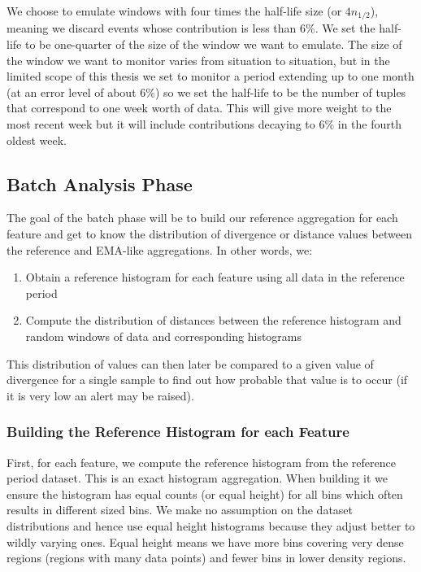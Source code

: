 We choose to emulate windows with four times the half-life size (or $4n_{1/2}$), meaning we discard events whose contribution is less than 6\%. We set the half-life to be one-quarter of the size of the window we want to emulate. The size of the window we want to monitor varies from situation to situation, but in the limited scope of this thesis we set to monitor a period extending up to one month (at an error level of about 6\%) so we set the half-life to be the number of tuples that correspond to one week worth of data. This will give more weight to the most recent week but it will include contributions decaying to 6\% in the fourth oldest week.

\subsection{Batch Analysis Phase} \label{sec:batch-phase}
The goal of the batch phase will be to build our reference aggregation for each feature and get to know the distribution of divergence or distance values between the reference and EMA-like aggregations. In other words, we:

\begin{enumerate}
    \item Obtain a reference histogram for each feature using all data in the reference period
    
    \item Compute the distribution of distances between the reference histogram and random windows of data and corresponding histograms
\end{enumerate}

This distribution of values can then later be compared to a given value of divergence for a single sample to find out how probable that value is to occur (if it is very low an alert may be raised).

\subsubsection*{Building the Reference Histogram for each Feature}

First, for each feature, we compute the reference histogram from the reference period dataset. This is an exact histogram aggregation. When building it we ensure the histogram has equal counts (or equal height) for all bins which often results in different sized bins. We make no assumption on the dataset distributions and hence use equal height histograms because they adjust better to wildly varying ones. Equal height means we have more bins covering very dense regions (regions with many data points) and fewer bins in lower density regions. 

